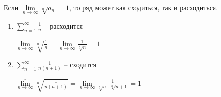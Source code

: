 \begin{remark}\slashns
	
	Если $ \overline{\lim\limits_{n \to \infty}} \sqrt[n]{a_n} = 1$, то ряд может как сходиться, так и расходиться.

	\begin{enumerate}

		\item $\sum\limits_{n = 1}^{\infty} \frac1n$ -- расходится

		$\overline{\lim\limits_{n \to \infty}} \sqrt[n]{\frac 1n} = \lim\limits_{n \to \infty} \frac 1 {\sqrt[n] {n}} = 1$

		\item $\sum\limits_{n = 1}^{\infty} \frac1{n(n+1)}$ -- сходится
	
		$\overline{\lim\limits_{n \to \infty}} \sqrt[n]{\frac 1{n(n+1)}} = \lim\limits_{n \to \infty} \frac 1 {\sqrt[n] {n} \cdot \sqrt[n] {n + 1}} = 1$
	\end{enumerate}
\end{remark}

